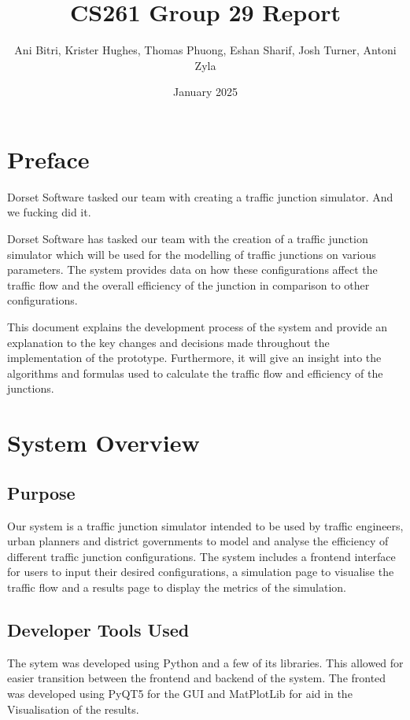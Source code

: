 \documentclass{article}
\title{\vspace{-1.5cm}CS261 Group 29 Report}
\author{Ani Bitri, Krister Hughes, Thomas Phuong, Eshan Sharif, Josh Turner, Antoni Zyla}
\date{January 2025}
\begin{document}
\maketitle

\section{Preface}

Dorset Software tasked our team with creating a traffic junction simulator. And we fucking did it. 

Dorset Software has tasked our team with the creation of a traffic junction simulator which will be used for the modelling of traffic junctions on various parameters. The system provides data on how these configurations 
affect the traffic flow and the overall efficiency of the junction in comparison to other configurations. 

This document explains the development process of the system and provide an explanation to the key changes and decisions made throughout the implementation of the prototype. Furthermore,
it will give an insight into the algorithms and formulas used to calculate the traffic flow and efficiency of the junctions.

\section{System Overview}

    \subsection{Purpose}

        Our system is a traffic junction simulator intended to be used by traffic engineers, urban planners and district governments to model and analyse the efficiency of different traffic junction configurations. The
        system includes a frontend interface for users to input their desired configurations, a simulation page to visualise the traffic flow and a results page to display the metrics of the simulation.

    \subsection{Developer Tools Used}

        The sytem was developed using Python and a few of its libraries. This allowed for easier transition between the frontend and backend of the system. The
        fronted was developed using PyQT5 for the GUI and MatPlotLib for aid in the Visualisation of the results. 
\end{document}
